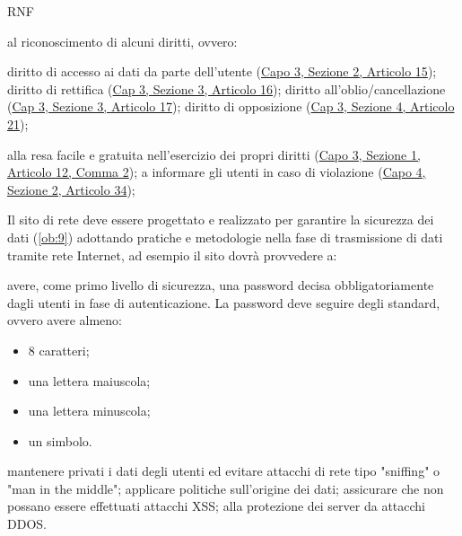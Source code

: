 \begin{listaPersonale}{RNF}
\begin{listaPersonale2}{}
         al riconoscimento di alcuni diritti, ovvero:
        \begin{listaPersonale3}{}
             diritto di accesso ai dati da parte dell'utente (\href{https://eur-lex.europa.eu/legal-content/IT/TXT/?uri=uriserv:OJ.L_.2016.119.01.0001.01.ITA&toc=OJ:L:2016:119:TOC#d1e2520-1-1}{Capo 3, Sezione 2, Articolo 15});
             diritto di rettifica (\href{https://eur-lex.europa.eu/legal-content/IT/TXT/?uri=uriserv:OJ.L_.2016.119.01.0001.01.ITA&toc=OJ:L:2016:119:TOC#d1e2606-1-1}{Cap 3, Sezione 3, Articolo 16});
             diritto all'oblio/cancellazione (\href{https://eur-lex.europa.eu/legal-content/IT/TXT/?uri=uriserv:OJ.L_.2016.119.01.0001.01.ITA&toc=OJ:L:2016:119:TOC#d1e2613-1-1}{Cap 3, Sezione 3, Articolo 17});
             diritto di opposizione (\href{https://eur-lex.europa.eu/legal-content/IT/TXT/?uri=uriserv:OJ.L_.2016.119.01.0001.01.ITA&toc=OJ:L:2016:119:TOC#d1e2810-1-1}{Cap 3, Sezione 4, Articolo 21});
        \end{listaPersonale3}

         alla resa facile e gratuita nell'esercizio dei propri diritti (\href{https://eur-lex.europa.eu/legal-content/IT/TXT/?uri=uriserv:OJ.L_.2016.119.01.0001.01.ITA&toc=OJ:L:2016:119:TOC#d1e2189-1-1}{Capo 3, Sezione 1, Articolo 12, Comma 2});
         a informare gli utenti in caso di violazione (\href{https://eur-lex.europa.eu/legal-content/IT/TXT/?uri=uriserv:OJ.L_.2016.119.01.0001.01.ITA&toc=OJ:L:2016:119:TOC#d1e3497-1-1}{Capo 4, Sezione 2, Articolo 34});
    \end{listaPersonale2}


     Il sito di rete deve essere progettato e realizzato per garantire la sicurezza dei dati (\ref{ob:9}) adottando pratiche e metodologie nella fase di trasmissione di dati tramite rete Internet, ad esempio il sito dovrà provvedere a:
    \begin{listaPersonale2}{}
         avere, come primo livello di sicurezza, una password decisa obbligatoriamente dagli utenti in fase di autenticazione. La password deve seguire degli standard, ovvero avere almeno: 
        \begin{itemize}
            \item 8 caratteri;
            \item una lettera maiuscola; 
            \item una lettera minuscola; 
            \item un simbolo.
        \end{itemize}
         mantenere privati i dati degli utenti ed evitare attacchi di rete tipo "sniffing" o "man in the middle";
         applicare politiche sull'origine dei dati;
         assicurare che non possano essere effettuati attacchi XSS;
         alla protezione dei server da attacchi DDOS.
    \end{listaPersonale2}


\end{listaPersonale}

